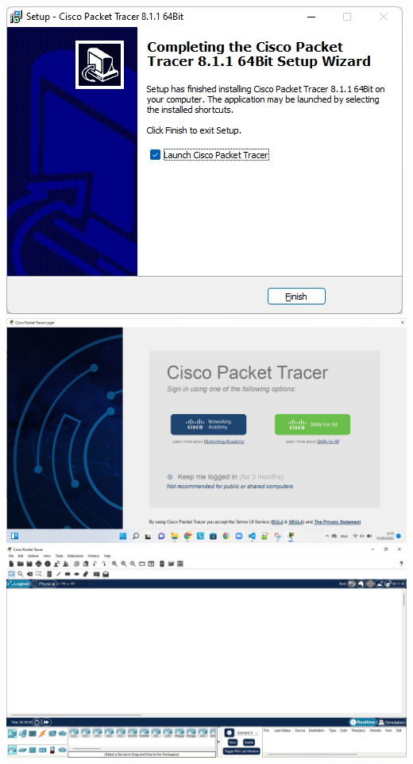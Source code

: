 \documentclass{article}
\begin{document}
\begin{flushleft}
\begin{enumerate}
{                \includegraphics[scale=0.8]{install/6.jpg}
                \includegraphics[scale=0.3]{install/7.jpg}
                \includegraphics[scale=0.3]{install/8.jpg}
            }
        \end{enumerate}
    \end{flushleft}
\end{document}
